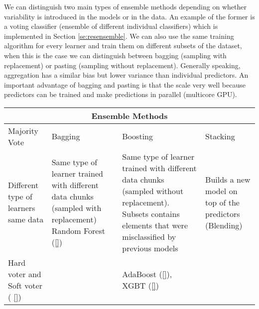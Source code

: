 \documentclass[11pt]{article}
\theoremstyle{definition}
\theoremstyle{remark}
\begin{document}
We can distinguish two main types of ensemble methods depending on whether variability is introduced in the models or in the data. An example of the former is a voting classifier (ensemble of different individual classifiers) which is implemented in Section \ref{se:resensemble}. We can also use the same training algorithm for every learner and train them on different subsets of the dataset, when this is the case we can distinguish between bagging (sampling with replacement) or pasting (sampling without replacement). 
Generally speaking, aggregation has a similar bias but lower variance than individual predictors. An important advantage of bagging and pasting is that the scale very well because predictors can be trained and make predictions in parallel (multicore GPU).


 \label{tab:ensemblemethods} 
\begin{tabular}{ |p{3cm}||p{3cm}|p{3cm}|p{2cm}| } %
 \hline
 \multicolumn{4}{|c|}{Ensemble Methods} \\
 \hline

 Majority Vote & Bagging & Boosting & Stacking\\
 \hline
 Different type of learners same data & Same type of learner trained with different data chunks (sampled with replacement) Random Forest (\ref{})  & Same type of learner trained with different data chunks (sampled without replacement). Subsets contains elements that were misclassified by previous models &  Builds a new model on top of the predictors (Blending) \\
 Hard voter and Soft voter ( \ref{})			  &                & AdaBoost (\ref{}), XGBT (\ref{})&  \\
 \hline

\end{tabular}
\end{document}
